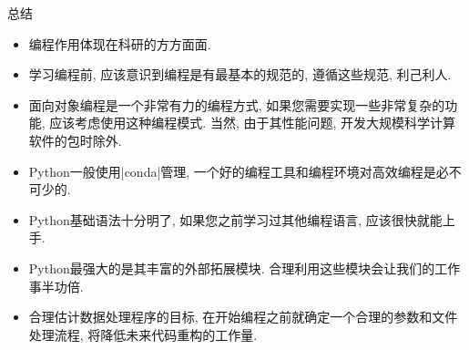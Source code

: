 \documentclass{beamer}
\begin{document}
    \begin{frame}[fragile]{总结}
    \begin{block}{}
      \begin{itemize}
        \item 编程作用体现在科研的方方面面.
        \item 学习编程前, 应该意识到编程是有最基本的规范的, 遵循这些规范, 利己利人.
        \item 面向对象编程是一个非常有力的编程方式, 如果您需要实现一些非常复杂的功能, 应该考虑使用这种编程模式. 当然, 由于其性能问题, 开发大规模科学计算软件的包时除外.
        \item Python一般使用\cverb|conda|管理, 一个好的编程工具和编程环境对高效编程是必不可少的.
        \item Python基础语法十分明了, 如果您之前学习过其他编程语言, 应该很快就能上手.
        \item Python最强大的是其丰富的外部拓展模块. 合理利用这些模块会让我们的工作事半功倍.
        \item 合理估计数据处理程序的目标, 在开始编程之前就确定一个合理的参数和文件处理流程, 将降低未来代码重构的工作量.
      \end{itemize}
    \end{block}
  \end{frame}
\end{document}

